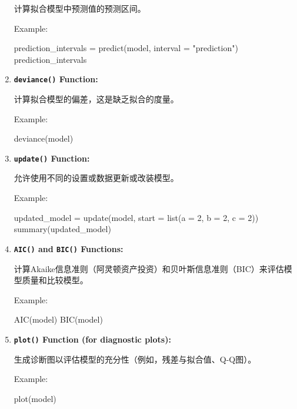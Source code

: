 \documentclass[
]{article}
\newenvironment{Shaded}{}{}
\newcommand{\AttributeTok}[1]{\textcolor[rgb]{0.49,0.56,0.16}{#1}}
\newcommand{\DecValTok}[1]{\textcolor[rgb]{0.25,0.63,0.44}{#1}}
\newcommand{\FunctionTok}[1]{\textcolor[rgb]{0.02,0.16,0.49}{#1}}
\newcommand{\NormalTok}[1]{#1}
\newcommand{\OtherTok}[1]{\textcolor[rgb]{0.00,0.44,0.13}{#1}}
\newcommand{\StringTok}[1]{\textcolor[rgb]{0.25,0.44,0.63}{#1}}
\begin{document}
\begin{enumerate}
  计算拟合模型中预测值的预测区间。

  Example:

\begin{Shaded}
\begin{Highlighting}[]
\NormalTok{prediction\_intervals }\OtherTok{=} \FunctionTok{predict}\NormalTok{(model, }\AttributeTok{interval =} \StringTok{"prediction"}\NormalTok{)}
\NormalTok{prediction\_intervals}
\end{Highlighting}
\end{Shaded}
\item
  \textbf{\texttt{deviance()} Function:}

  计算拟合模型的偏差，这是缺乏拟合的度量。

  Example:

\begin{Shaded}
\begin{Highlighting}[]
\FunctionTok{deviance}\NormalTok{(model)}
\end{Highlighting}
\end{Shaded}
\item
  \textbf{\texttt{update()} Function:}

  允许使用不同的设置或数据更新或改装模型。

  Example:

\begin{Shaded}
\begin{Highlighting}[]
\NormalTok{updated\_model }\OtherTok{=} \FunctionTok{update}\NormalTok{(model, }\AttributeTok{start =} \FunctionTok{list}\NormalTok{(}\AttributeTok{a =} \DecValTok{2}\NormalTok{, }\AttributeTok{b =} \DecValTok{2}\NormalTok{, }\AttributeTok{c =} \DecValTok{2}\NormalTok{))}
\FunctionTok{summary}\NormalTok{(updated\_model)}
\end{Highlighting}
\end{Shaded}
\item
  \textbf{\texttt{AIC()} and \texttt{BIC()} Functions:}

  计算Akaike信息准则（阿灵顿资产投资）和贝叶斯信息准则（BIC）来评估模型质量和比较模型。

  Example:

\begin{Shaded}
\begin{Highlighting}[]
\FunctionTok{AIC}\NormalTok{(model)}
\FunctionTok{BIC}\NormalTok{(model)}
\end{Highlighting}
\end{Shaded}
\item
  \textbf{\texttt{plot()} Function (for diagnostic plots):}

  生成诊断图以评估模型的充分性（例如，残差与拟合值、Q-Q图）。

  Example:

\begin{Shaded}
\begin{Highlighting}[]
\FunctionTok{plot}\NormalTok{(model)}
\end{Highlighting}
\end{Shaded}
\end{enumerate}
\end{document}
